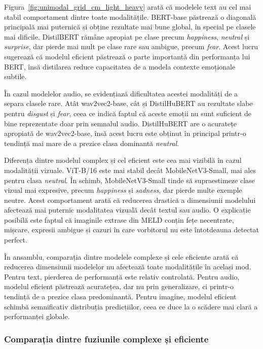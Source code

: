 \documentclass[12pt, a4paper]{article}
\begin{document}
Figura~\ref{fig:unimodal_grid_cm_light_heavy} arată că modelele text au cel mai stabil comportament dintre toate modalitățile. BERT-base păstrează o diagonală principală mai puternică și obține rezultate mai bune global, în special pe clasele mai dificile. DistilBERT rămâne apropiat pe clase precum \textit{happiness}, \textit{neutral} și \textit{surprise}, dar pierde mai mult pe clase rare sau ambigue, precum \textit{fear}. Acest lucru sugerează că modelul eficient păstrează o parte importantă din performanța lui BERT, însă distilarea reduce capacitatea de a modela contexte emoționale subtile.

În cazul modelelor audio, se evidențiază dificultatea acestei modalități de a separa clasele rare. Atât wav2vec2-base, cât și DistilHuBERT au rezultate slabe pentru \textit{disgust} și \textit{fear}, ceea ce indică faptul că aceste emoții nu sunt suficient de bine reprezentate doar prin semnalul audio. DistilHuBERT are o acuratețe apropiată de wav2vec2-base, însă acest lucru este obținut în principal printr-o tendință mai mare de a prezice clasa dominantă \textit{neutral}.

Diferența dintre modelul complex și cel eficient este cea mai vizibilă în cazul modalității vizuale. ViT-B/16 este mai stabil decât MobileNetV3-Small, mai ales pentru clasa \textit{neutral}. În schimb, MobileNetV3-Small tinde să supraestimeze clase vizual mai expresive, precum \textit{happiness} și \textit{sadness}, dar pierde multe exemple neutre. Acest comportament arată că reducerea drastică a dimensiunii modelului afectează mai puternic modalitatea vizuală decât textul sau audio. O explicație posibilă este faptul că imaginile extrase din MELD conțin fețe necentrate, mișcare, expresii ambigue și cazuri în care vorbitorul nu este întotdeauna detectat perfect. 

În ansamblu, comparația dintre modelele complexe și cele eficiente arată că reducerea dimensiunii modelelor nu afectează toate modalitățile în același mod. Pentru text, pierderea de performanță este relativ controlată. Pentru audio, modelul eficient păstrează acuratețea, dar nu prin generalizare, ci printr-o tendință de a prezice clasa predominantă. Pentru imagine, modelul eficient schimbă semnificativ distribuția predicțiilor, ceea ce duce la o scădere mai clară a performanței globale.

\subsubsection{Comparația dintre fuziunile complexe și eficiente}
\end{document}
